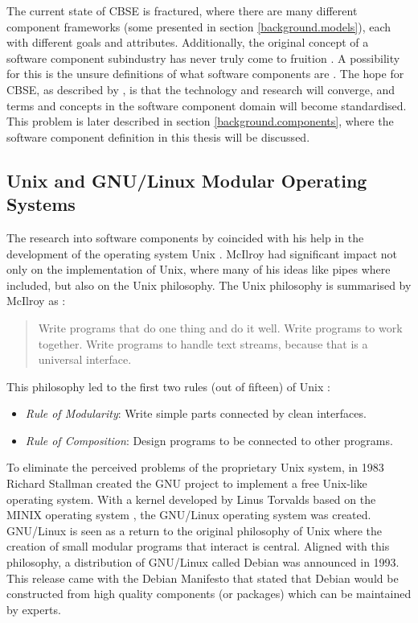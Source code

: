 The current state of CBSE is fractured, where there are many different component frameworks (some presented in section \ref{background.models}),
each with different goals and attributes.
Additionally, the original concept of a software component subindustry has never truly come to fruition \citep{Szyperski2002}.
A possibility for this is the unsure definitions of what software components are \citep{Crnkovic2011}.
The hope for CBSE, as described by \cite{Crnkovic2011}, is that the technology and research will converge, and terms and concepts in the software component domain will become standardised.
This problem is later described in section \ref{background.components}, where the software component definition in this thesis will be discussed.

\subsection{Unix and GNU/Linux Modular Operating Systems}
The research into software components by \cite{McIlroy1969} coincided with his help in the development of the operating system Unix \citep{raymond2003art}. 
McIlroy had significant impact not only on the implementation of Unix, where many of his ideas like pipes where included,
but also on the Unix philosophy. 
The Unix philosophy is summarised by McIlroy as \citep{Salus1994}:
\begin{quote}
Write programs that do one thing and do it well. Write programs to work together. 
Write programs to handle text streams, because that is a universal interface.
\end{quote}

This philosophy led to the first two rules (out of fifteen) of Unix \citep{raymond2003art}:
\begin{itemize}
  \item \textit{Rule of Modularity}: Write simple parts connected by clean interfaces.
  \item \textit{Rule of Composition}: Design programs to be connected to other programs.
\end{itemize} 

To eliminate the perceived problems of the proprietary Unix system, in 1983 Richard Stallman created the GNU project \citep{stallman1985gnu} to implement a free Unix-like operating system.
With a kernel developed by Linus Torvalds based on the MINIX operating system \citep{tanenbaum1989minix} , the GNU/Linux operating system \citep{torvalds2002just} was created.
GNU/Linux is seen as a return to the original philosophy of Unix \citep{Gancarz2003} where the creation of small modular programs that interact is central.
Aligned with this philosophy, a distribution of GNU/Linux called Debian \citep{Barth2005} was announced in 1993.
This release came with the Debian Manifesto \citep{murdock1994brief} 
that stated that Debian would be constructed from high quality components (or packages) which can be maintained by experts.

